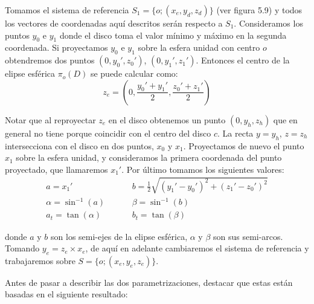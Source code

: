 Tomamos el sistema de referencia $S_1=\{o;(x_e, y_d, z_d)\}$ (ver figura 5.9) y todos los vectores de coordenadas aquí descritos serán respecto a $S_1$. Consideramos los puntos $y_0$ e $y_1$ donde el disco toma el valor mínimo y máximo en la segunda coordenada. Si proyectamos $y_0$ e $y_1$ sobre la esfera unidad con centro $o$ obtendremos dos puntos $(0,y_0',z_0')$, $(0,y_1',z_1')$. Entonces el centro de la elipse esférica $\pi_o(D)$ se puede calcular como:
$$z_e = (0,\frac{y_0'+y_1'}{2}, \frac{z_0' + z_1'}{2}) $$

Notar que al reproyectar $z_e$ en el disco obtenemos un punto $(0,y_h,z_h)$ que en general no tiene porque coincidir con el centro del disco $c$. La recta $y = y_h$, $z=z_h$ intersecciona con el disco en dos puntos, $x_0$ y $x_1$. Proyectamos de nuevo el punto $x_1$ sobre la esfera unidad, y consideramos la primera coordenada del punto proyectado, que llamaremos $x_1'$. Por último tomamos los siguientes valores:
\begin{align*}
a = x_1'&\hspace{1cm} b=\frac{1}{2}\sqrt{(y_1'-y_0')^2 + (z_1'-z_0')^2}\\
\alpha = \sin^{-1}(a)&\hspace{1cm} \beta=\sin^{-1}(b)\\
a_t = \tan(\alpha) &\hspace{1cm}b_t=\tan(\beta)
\end{align*}

donde $a$ y $b$ son los semi-ejes de la elipse esférica, $\alpha$ y $\beta$ son sus semi-arcos. Tomando $y_e=z_e\times x_e$, de aquí en adelante cambiaremos el sistema de referencia y trabajaremos sobre $S=\{o;(x_e, y_e, z_e)\}$.

Antes de pasar a describir las dos parametrizaciones, destacar que estas están basadas en el siguiente resultado:

